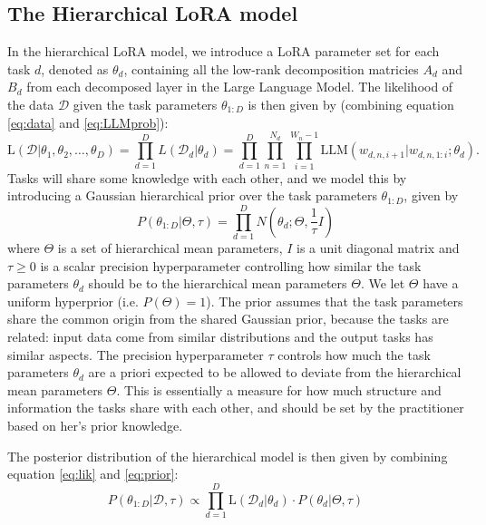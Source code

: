 \documentclass{article}
\begin{document}
\subsection{The Hierarchical LoRA model} \label{sec:hlora}
In the hierarchical LoRA model, we introduce a LoRA parameter set for each task $d$, denoted as $\theta_d$, containing all the low-rank decomposition matricies $A_d$ and $B_d$ from each decomposed layer in the Large Language Model. The likelihood of the data $\mathcal{D}$ given the task parameters $\theta_{1:D}$ is then given by (combining equation \ref{eq:data} and \ref{eq:LLMprob}):
\begin{equation} \label{eq:lik}
    \text{L}(\mathcal{D} | \theta_1, \theta_2, \ldots, \theta_D) = \prod_{d=1}^D L(\mathcal{D}_d | \theta_d) = \prod_{d=1}^D \prod_{n=1}^{N_d} \prod_{i=1}^{W_n-1} \text{LLM}(w_{d,n,i+1} | w_{d,n,1:i}; \theta_d).
\end{equation}
%
%
Tasks will share some knowledge with each other, and we model this by introducing a Gaussian hierarchical prior over the task parameters $\theta_{1:D}$, given by
\begin{equation} \label{eq:prior}
    P(\theta_{1:D} | \Theta, \tau ) = \prod_{d=1}^D N(\theta_d ; \Theta, \frac{1}{\tau} I)
\end{equation}
%
where $\Theta$ is a set of hierarchical mean parameters, $I$ is a unit diagonal matrix and $\tau \geq 0$ is a scalar precision hyperparameter controlling how similar the task parameters $\theta_d$ should be to the hierarchical mean parameters $\Theta$.
We let $\Theta$ have a uniform hyperprior (i.e. $P(\Theta) = 1$). The prior assumes that the task parameters share the common origin from the shared Gaussian prior, because the tasks are related: input data come from similar distributions and the output tasks has similar aspects. 
The precision hyperparameter $\tau$ controls how much the task parameters $\theta_d$ are a priori expected to be allowed to deviate from the hierarchical mean parameters $\Theta$. 
This is essentially a measure for how much structure and information the tasks share with each other, and should be set by the practitioner based on her's prior knowledge.

The posterior distribution of the hierarchical model is then given by combining equation \ref{eq:lik} and \ref{eq:prior}:
\begin{equation} \label{eq:posterior}
    P(\theta_{1:D} | \mathcal{D}, \tau) \propto \prod_{d=1}^D \text{L}(\mathcal{D}_d | \theta_d) \cdot P(\theta_d | \Theta, \tau)
\end{equation}
%
%
\end{document}
